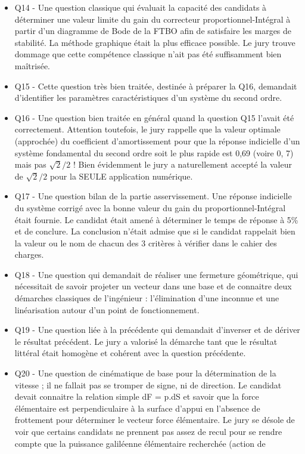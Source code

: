 \documentclass[10pt,fleqn]{article} %
\begin{document}
\begin{itemize}
\item Q14 - Une question classique qui évaluait la capacité des candidats à déterminer une valeur limite
du gain du correcteur proportionnel-Intégral à partir d’un diagramme de Bode de la FTBO afin de
satisfaire les marges de stabilité. La méthode graphique était la plus efficace possible. Le jury trouve
dommage que cette compétence classique n’ait pas été suffisamment bien maîtrisée.
\item Q15 - Cette question très bien traitée, destinée à préparer la Q16, demandait d’identifier les paramètres
caractéristiques d’un système du second ordre.
\item Q16 - Une question bien traitée en général quand la question Q15 l’avait été correctement. Attention
toutefois, le jury rappelle que la valeur optimale (approchée) du coefficient d’amortissement pour que
la réponse indicielle d’un système fondamental du second ordre soit le plus rapide est 0,69 (voire 0, 7)
mais pas $\sqrt{2}/2$ ! Bien évidemment le jury a naturellement accepté la valeur de $\sqrt{2}/2$ pour la SEULE
application numérique.
\item Q17 - Une question bilan de la partie asservissement. Une réponse indicielle du système corrigé avec
la bonne valeur du gain du proportionnel-Intégral était fournie. Le candidat était amené à déterminer
le temps de réponse à 5\% et de conclure. La conclusion n’était admise que si le candidat rappelait bien
la valeur ou le nom de chacun des 3 critères à vérifier dans le cahier des charges.
\item Q18 - Une question qui demandait de réaliser une fermeture géométrique, qui nécessitait de savoir
projeter un vecteur dans une base et de connaitre deux démarches classiques de l’ingénieur : l’élimination
d’une inconnue et une linéarisation autour d’un point de fonctionnement.
\item Q19 - Une question liée à la précédente qui demandait d’inverser et de dériver le résultat précédent.
Le jury a valorisé la démarche tant que le résultat littéral était homogène et cohérent avec la question
précédente.
\item Q20 - Une question de cinématique de base pour la détermination de la vitesse ; il ne fallait pas
se tromper de signe, ni de direction. Le candidat devait connaitre la relation simple dF = p.dS et
savoir que la force élémentaire est perpendiculaire à la surface d’appui en l’absence de frottement pour
déterminer le vecteur force élémentaire. Le jury se désole de voir que certains candidats ne prennent
pas assez de recul pour se rendre compte que la puissance galiléenne élémentaire recherchée (action de

\end{itemize}
\end{document}
